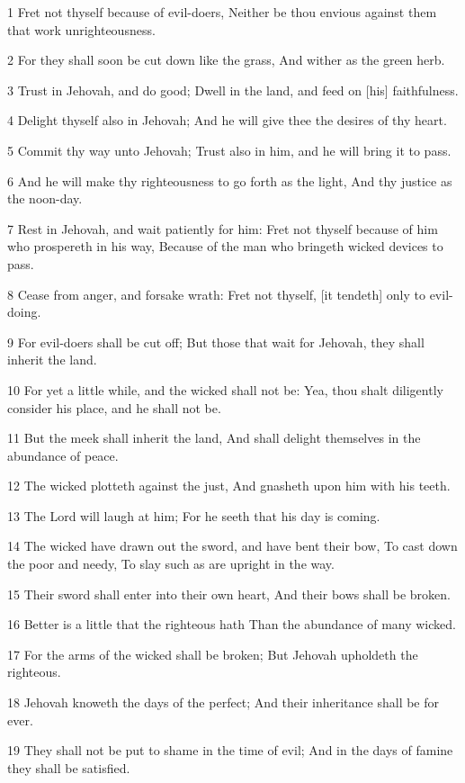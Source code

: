 \par 1 Fret not thyself because of evil-doers, Neither be thou envious against them that work unrighteousness.
\par 2 For they shall soon be cut down like the grass, And wither as the green herb.
\par 3 Trust in Jehovah, and do good; Dwell in the land, and feed on [his] faithfulness.
\par 4 Delight thyself also in Jehovah; And he will give thee the desires of thy heart.
\par 5 Commit thy way unto Jehovah; Trust also in him, and he will bring it to pass.
\par 6 And he will make thy righteousness to go forth as the light, And thy justice as the noon-day.
\par 7 Rest in Jehovah, and wait patiently for him: Fret not thyself because of him who prospereth in his way, Because of the man who bringeth wicked devices to pass.
\par 8 Cease from anger, and forsake wrath: Fret not thyself, [it tendeth] only to evil-doing.
\par 9 For evil-doers shall be cut off; But those that wait for Jehovah, they shall inherit the land.
\par 10 For yet a little while, and the wicked shall not be: Yea, thou shalt diligently consider his place, and he shall not be.
\par 11 But the meek shall inherit the land, And shall delight themselves in the abundance of peace.
\par 12 The wicked plotteth against the just, And gnasheth upon him with his teeth.
\par 13 The Lord will laugh at him; For he seeth that his day is coming.
\par 14 The wicked have drawn out the sword, and have bent their bow, To cast down the poor and needy, To slay such as are upright in the way.
\par 15 Their sword shall enter into their own heart, And their bows shall be broken.
\par 16 Better is a little that the righteous hath Than the abundance of many wicked.
\par 17 For the arms of the wicked shall be broken; But Jehovah upholdeth the righteous.
\par 18 Jehovah knoweth the days of the perfect; And their inheritance shall be for ever.
\par 19 They shall not be put to shame in the time of evil; And in the days of famine they shall be satisfied.
